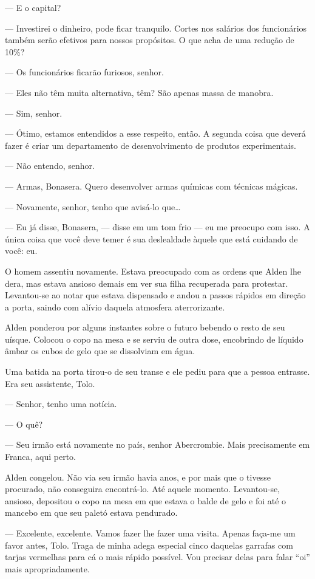 --- E o capital?

--- Investirei o dinheiro, pode ficar tranquilo. Cortes nos salários dos
funcionários também serão efetivos para nossos propósitos. O que acha de uma
redução de 10\%?

--- Os funcionários ficarão furiosos, senhor.

--- Eles não têm muita alternativa, têm? São apenas massa de manobra.

--- Sim, senhor.

--- Ótimo, estamos entendidos a esse respeito, então. A segunda coisa que
deverá fazer é criar um departamento de desenvolvimento de produtos
experimentais.

--- Não entendo, senhor.

--- Armas, Bonasera. Quero desenvolver armas químicas com técnicas mágicas.

--- Novamente, senhor, tenho que avisá-lo que\ldots

--- Eu já disse, Bonasera, --- disse em um tom frio --- eu me preocupo com
isso. A única coisa que você deve temer é sua deslealdade àquele que está
cuidando de você: eu.

O homem assentiu novamente. Estava preocupado com as ordens que Alden lhe dera,
mas estava ansioso demais em ver sua filha recuperada para protestar.
Levantou-se ao notar que estava dispensado e andou a passos rápidos em direção
a porta, saindo com alívio daquela atmosfera aterrorizante.

Alden ponderou por alguns instantes sobre o futuro bebendo o resto de seu
uísque. Colocou o copo na mesa e se serviu de outra dose, encobrindo de líquido
âmbar os cubos de gelo que se dissolviam em água.

Uma batida na porta tirou-o de seu transe e ele pediu para que a pessoa
entrasse. Era seu assistente, Tolo.

--- Senhor, tenho uma notícia.

--- O quê?

--- Seu irmão está novamente no país, senhor Abercrombie. Mais precisamente em
Franca, aqui perto.

Alden congelou. Não via seu irmão havia anos, e por mais que o tivesse
procurado, não conseguira encontrá-lo. Até aquele momento. Levantou-se,
ansioso, depositou o copo na mesa em que estava o balde de gelo e foi até o
mancebo em que seu paletó estava pendurado.

--- Excelente, excelente. Vamos fazer lhe fazer uma visita. Apenas faça-me um
favor antes, Tolo. Traga de minha adega especial cinco daquelas garrafas com
tarjas vermelhas para cá o mais rápido possível. Vou precisar delas para falar
“oi” mais apropriadamente.
